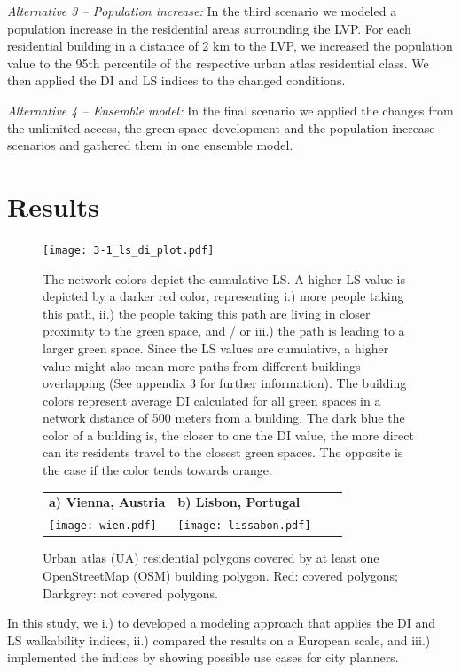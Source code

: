 \documentclass[10pt]{article}
\begin{document}
\textit{Alternative 3 – Population increase:} In the third scenario we modeled a population increase in the residential areas surrounding the LVP.
For each residential building in a distance of 2 km to the LVP, we increased the population value to the 95th percentile of the respective urban atlas residential class.
We then applied the DI and LS indices to the changed conditions.

\textit{Alternative 4 – Ensemble model:} In the final scenario we applied the changes from the unlimited access, the green space development and the population increase scenarios and gathered them in one ensemble model. 



\section{Results}

\begin{figure}
\centering
\texttt{[image: 3-1\_ls\_di\_plot.pdf]}
\caption{The network colors depict the cumulative LS. A higher LS value is depicted by a darker red color, representing i.) more people taking this path, ii.) the people taking this path are living in closer proximity to the green space, and / or iii.) the path is leading to a larger green space. Since the LS values are cumulative, a higher value might also mean more paths from different buildings overlapping (See appendix 3 for further information). The building colors represent average DI calculated for all green spaces in a network distance of 500 meters from a building. The dark blue the color of a building is, the closer to one the DI value, the more direct can its residents travel to the closest green spaces. The opposite is the case if the color tends towards orange.}
\label{fig:lsdi}
\end{figure}

\begin{figure}[h!]
\centering
\begin{tabular}{llll}
\textbf{a) Vienna, Austria} & \textbf{b) Lisbon, Portugal} \\
\texttt{[image: wien.pdf]} & \texttt{[image: lissabon.pdf]}
\end{tabular}
\caption{Urban atlas (UA) residential polygons covered by at least one OpenStreetMap (OSM) building polygon. Red: covered polygons; Darkgrey: not covered polygons.}
\label{fig:osmcovexample}
\end{figure}

In this study, we i.) to developed a modeling approach that applies the DI and LS walkability indices, ii.) compared the results on a European scale, and iii.) implemented the indices by showing possible use cases for city planners.
\end{document}
